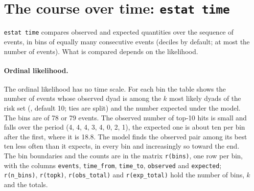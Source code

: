 \section{The course over time: \texttt{estat time}}\label{sec:estat-time}

\texttt{estat time} compares observed and expected quantities over the sequence of events, in  bins of equally many consecutive events (deciles by default; at most the number of events). What is compared depends on the likelihood.

\paragraph{Ordinal likelihood.} The ordinal likelihood has no time scale. For each bin the table shows the number of events whose observed dyad is among the $k$ most likely dyads of the risk set (, default 10; ties are split) and the number expected under the model.
The bins are of 78 or 79 events. The observed number of top-10 hits is small and falls over the period (4, 4, 4, 3, 4, 0, 2, 1), the expected one is about ten per bin after the first, where it is 18.8. The model finds the observed pair among its best ten less often than it expects, in every bin and increasingly so toward the end. The bin boundaries and the counts are in the matrix \texttt{r(bins)}, one row per bin, with the columns \texttt{events}, \texttt{time\_from}, \texttt{time\_to}, \texttt{observed} and \texttt{expected}; \texttt{r(n\_bins)}, \texttt{r(topk)}, \texttt{r(obs\_total)} and \texttt{r(exp\_total)} hold the number of bins, $k$ and the totals.

